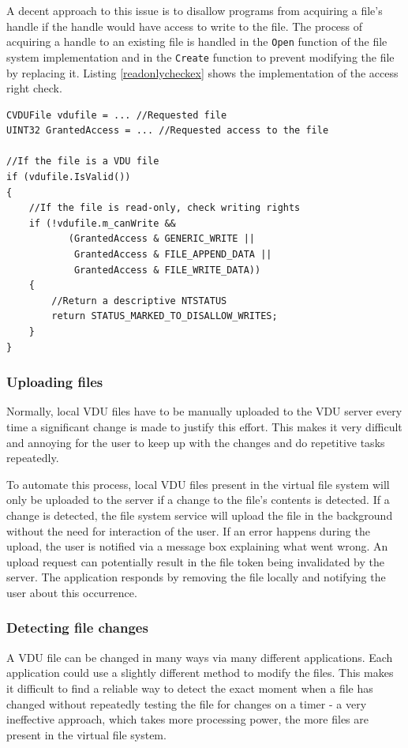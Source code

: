A decent approach to this issue is to disallow programs from acquiring a file's handle if the handle would have access to write to the file. The process of acquiring a handle to an existing file is handled in the \lstinline{Open} function of the file system implementation and in the \lstinline{Create} function to prevent modifying the file by replacing it. Listing \ref{readonlycheckex} shows the implementation of the access right check.
\begin{lstlisting}[caption={Implementation of the read-only check for files, to disallow creating a handle with write access.}, label=readonlycheckex]
CVDUFile vdufile = ... //Requested file
UINT32 GrantedAccess = ... //Requested access to the file

//If the file is a VDU file
if (vdufile.IsValid())
{
    //If the file is read-only, check writing rights
    if (!vdufile.m_canWrite &&
           (GrantedAccess & GENERIC_WRITE ||
            GrantedAccess & FILE_APPEND_DATA ||
            GrantedAccess & FILE_WRITE_DATA))
    {
        //Return a descriptive NTSTATUS
        return STATUS_MARKED_TO_DISALLOW_WRITES;
    }
}
\end{lstlisting}

\subsubsection{Uploading files}
Normally, local VDU files have to be manually uploaded to the VDU server every time a significant change is made to justify this effort. This makes it very difficult and annoying for the user to keep up with the changes and do repetitive tasks repeatedly.

To automate this process, local VDU files present in the virtual file system will only be uploaded to the server if a change to the file's contents is detected. If a change is detected, the file system service will upload the file in the background without the need for interaction of the user. If an error happens during the upload, the user is notified via a message box explaining what went wrong. An upload request can potentially result in the file token being invalidated by the server. The application responds by removing the file locally and notifying the user about this occurrence.

\subsubsection{Detecting file changes}
A VDU file can be changed in many ways via many different applications. Each application could use a slightly different method to modify the files. This makes it difficult to find a reliable way to detect the exact moment when a file has changed without repeatedly testing the file for changes on a timer - a very ineffective approach, which takes more processing power, the more files are present in the virtual file system.

